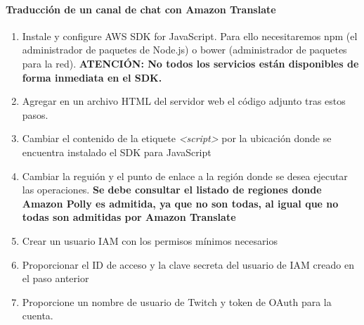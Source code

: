 \documentclass[runningheads]{llncs}
\begin{document}
	\paragraph{Traducción de un canal de chat con Amazon Translate}
	\begin{enumerate}
		\item Instale y configure AWS SDK for JavaScript. Para ello necesitaremos npm (el administrador de paquetes de Node.js) o bower (administrador de paquetes para la red). \textbf{ATENCIÓN: No todos los servicios están disponibles de forma inmediata en el SDK.}
		\item Agregar en un archivo HTML del servidor web el código adjunto tras estos pasos.
		
		\item Cambiar el contenido de la etiquete \textit{<script>}
		por la ubicación donde se encuentra instalado el SDK para JavaScript
		\item Cambiar la reguión y el punto de enlace a la región donde se desea ejecutar las operaciones. \textbf{Se debe consultar el listado de regiones donde Amazon Polly es admitida, ya que no son todas, al igual que no todas son admitidas por Amazon Translate}
		\item Crear un usuario IAM con los permisos mínimos necesarios
		\item Proporcionar el ID de acceso y la clave secreta del usuario de IAM creado en el paso anterior
		\item Proporcione un nombre de usuario de Twitch y token de OAuth para la cuenta.
	\end{enumerate}
\end{document}
